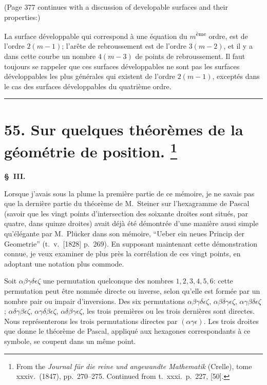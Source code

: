 \documentclass[11pt,a4paper]{article}
\theoremstyle{plain}
\theoremstyle{definition}
\begin{document}
(Page 377 continues with a discussion of developable surfaces and their properties:)

La surface d\'{e}veloppable qui correspond \`{a} une \'{e}quation du $m$\textsuperscript{\`{e}me} ordre,
est de l'ordre $2(m-1)$; l'ar\^{e}te de rebroussement est de l'ordre $3(m-2)$,
et il y a dans cette courbe un nombre $4(m-3)$ de points de rebroussement.
Il faut toujours se rappeler que ces surfaces d\'{e}veloppables ne sont pas les
surfaces d\'{e}veloppables les plus g\'{e}n\'{e}rales qui existent de l'ordre $2(m-1)$,
except\'{e}s dans le cas des surfaces d\'{e}veloppables du quatri\`{e}me ordre.

\bigskip
\hrule
\bigskip


\newpage
\section[Sur quelques th\'{e}or\`{e}mes de la g\'{e}om\'{e}trie de position]{%
55. Sur quelques th\'{e}or\`{e}mes de la g\'{e}om\'{e}trie de position.%
\footnote{From the \textit{Journal f\"{u}r die reine und angewandte Mathematik} (Crelle), tome xxxiv.\ (1847), pp.~270--275. Continued from t.~xxxi.\ p.~227, [50].}}

\textbf{\S~III.}

Lorsque j'avais sous la plume la premi\`{e}re partie de ce m\'{e}moire, je ne savais
pas que la derni\`{e}re partie du th\'{e}or\`{e}me de M.~Steiner sur l'hexagramme de Pascal
(savoir que les vingt points d'intersection des soixante droites sont situ\'{e}s, par quatre,
dans quinze droites) avait d\'{e}j\`{a} \'{e}t\'{e} d\'{e}montr\'{e}e d'une mani\`{e}re aussi simple qu'\'{e}l\'{e}gante
par M.~Pl\"{u}cker dans son m\'{e}moire, ``Ueber ein neues Princip der Geometrie''
(t.~v.\ [1828] p.~269). En supposant maintenant cette d\'{e}monstration connue,
je veux examiner de plus pr\`{e}s la corr\'{e}lation de ces vingt points, en adoptant
une notation plus commode.

Soit $\alpha\beta\gamma\delta\epsilon\zeta$ une permutation quelconque des nombres $1, 2, 3, 4, 5, 6$:
cette permutation peut \^{e}tre nomm\'{e}e directe ou inverse, selon qu'elle est form\'{e}e
par un nombre pair ou impair d'inversions. Des six permutations
$\alpha\beta\gamma\delta\epsilon\zeta$,
$\alpha\beta\delta\gamma\epsilon\zeta$,
$\alpha\gamma\beta\delta\epsilon\zeta$;
$\alpha\delta\gamma\beta\epsilon\zeta$,
$\alpha\gamma\delta\beta\epsilon\zeta$,
$\alpha\delta\beta\gamma\epsilon\zeta$,
les trois premi\`{e}res ou les trois derni\`{e}res sont directes.
Nous repr\'{e}senterons les trois permutations directes par $(\alpha\gamma\epsilon)$.
Les trois droites que donne le th\'{e}or\`{e}me de Pascal, appliqu\'{e} aux hexagones
correspondants \`{a} ce symbole, se coupent dans un m\^{e}me point.
\end{document}
